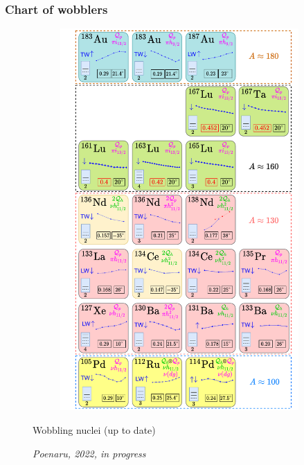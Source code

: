 \documentclass{beamer}
\begin{document}
\begin{frame}
  \frametitle{Chart of wobblers}
  \begin{figure}
    \centering
    \begin{minipage}{.5\textwidth}
      \begin{figure}
        \centering
        \includegraphics[scale=0.22]{Figs/wobblers-chart.pdf}
      \end{figure}
    \end{minipage}%
    \begin{minipage}{.5\textwidth}
      \par Wobbling nuclei (up to date)
      \par \textit{Poenaru, 2022, in progress}
    \end{minipage}
    \end{figure}
\end{frame}

\end{document}
